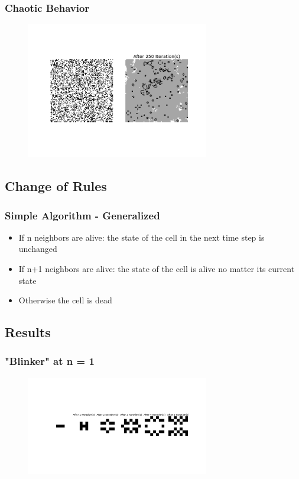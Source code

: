 \documentclass{beamer}
\begin{document}
\frame
{
  \frametitle{Chaotic Behavior}
    \begin{figure}
   \includegraphics[width = 300]{chaotic}
   \end{figure}
}



\subsection{Change of Rules}
\frame
{
  \frametitle{Simple Algorithm - Generalized}

  \begin{itemize}
  \item If n neighbors are alive: the state of the cell in the next time step is unchanged
  \item If n+1 neighbors are alive: the state of the cell is alive no matter its current state 
  \item Otherwise the cell is dead
  \end{itemize}  
}


\subsection{Results}
\frame
{
  \frametitle{"Blinker" at n = 1}
  \begin{figure}
   \includegraphics[width = 300]{blinker12}
   \end{figure}
}
\end{document}
